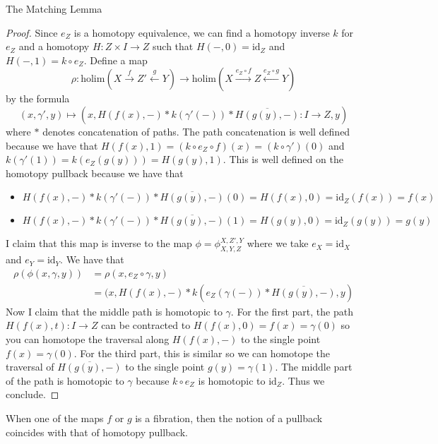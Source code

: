 \documentclass[a4paper]{article}
\begin{document}
\begin{thm}{The Matching Lemma}{}
\begin{proof}
Since $e_Z$ is a homotopy equivalence, we can find a homotopy inverse $k$ for $e_Z$ and a homotopy $H:Z\times I\to Z$ such that $H(-,0)=\text{id}_Z$ and $H(-,1)=k\circ e_Z$. Define a map $$\rho:\text{holim}(X\overset{f}{\rightarrow}Z'\overset{g}{\leftarrow}Y)\to\text{holim}(X\overset{e_Z\circ f}{\rightarrow}Z\overset{e_Z\circ g}{\leftarrow}Y)$$ by the formula $$(x,\gamma',y)\mapsto(x,H(f(x),-)\ast k(\gamma'(-))\ast\overline{H(g(y),-)}:I\to Z,y)$$ where $\ast$ denotes concatenation of paths. The path concatenation is well defined because we have that $H(f(x),1)=(k\circ e_Z\circ f)(x)=(k\circ\gamma')(0)$ and $k(\gamma'(1))=k(e_Z(g(y)))=H(g(y),1)$. This is well defined on the homotopy pullback because we have that 
\begin{itemize}
\item $H(f(x),-)\ast k(\gamma'(-))\ast\overline{H(g(y),-)}(0)=H(f(x),0)=\text{id}_Z(f(x))=f(x)$
\item $H(f(x),-)\ast k(\gamma'(-))\ast\overline{H(g(y),-)}(1)=H(g(y),0)=\text{id}_Z(g(y))=g(y)$
\end{itemize}
I claim that this map is inverse to the map $\phi=\phi_{X,Y,Z}^{X,Z',Y}$ where we take $e_X=\text{id}_X$ and $e_Y=\text{id}_Y$. We have that 
\begin{align*}
\rho(\phi(x,\gamma,y))&=\rho(x,e_Z\circ\gamma,y)\\
&=(x,H(f(x),-)\ast k(e_Z(\gamma(-))\ast\overline{H(g(y),-)},y)
\end{align*}
Now I claim that the middle path is homotopic to $\gamma$. For the first part, the path $H(f(x),t):I\to Z$ can be contracted to $H(f(x),0)=f(x)=\gamma(0)$ so you can homotope the traversal along $H(f(x),-)$ to the single point $f(x)=\gamma(0)$. For the third part, this is similar so we can homotope the traversal of $\overline{H(g(y),-)}$ to the single point $g(y)=\gamma(1)$. The middle part of the path is homotopic to $\gamma$ because $k\circ e_Z$ is homotopic to $\text{id}_Z$. Thus we conclude. 
\end{proof}
\end{thm}

When one of the maps $f$ or $g$ is a fibration, then the notion of a pullback coincides with that of homotopy pullback. 
\end{document}
